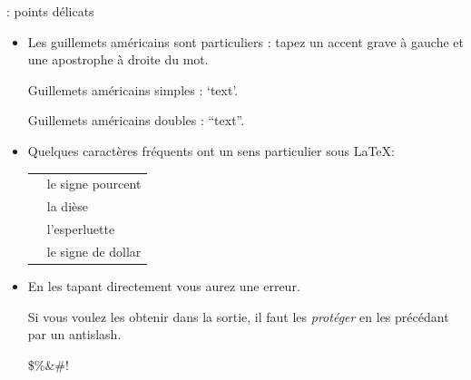 \documentclass{beamer}
\begin{document}
\begin{frame}[fragile]{\insertsubsection{} : points délicats}
\small
\begin{itemize}
\item Les guillemets américains sont particuliers : 
tapez un accent grave \keystroke{\`{}} à gauche et une apostrophe \keystroke{\'{}} à droite du mot.
\begin{exampletwouptiny}
Guillemets américains
simples : `text'.

Guillemets américains
doubles : ``text''.
\end{exampletwouptiny}

\item Quelques caractères fréquents ont un sens particulier sous \LaTeX:\\[1ex]
\begin{tabular}{cl}
\keystrokebftt{\%} & le signe pourcent                 \\
\keystrokebftt{\#} & la dièse                       \\
\keystrokebftt{\&} & l'esperluette                  \\
\keystrokebftt{\$} & le signe de dollar             \\
\end{tabular}
\item En les tapant directement vous aurez une erreur. 

Si vous voulez les \mbox{obtenir} dans la sortie, il faut les \emph{protéger} en les précédant par un antislash.
\begin{exampletwoup}
\$\%\&\#!
\end{exampletwoup}
\end{itemize}
\end{frame}
\end{document}
